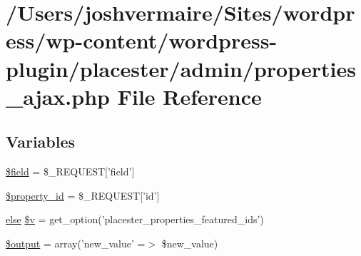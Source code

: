 \hypertarget{properties__ajax_8php}{
\section{/Users/joshvermaire/Sites/wordpress/wp-\/content/wordpress-\/plugin/placester/admin/properties\_\-ajax.php File Reference}
\label{dd/d22/properties__ajax_8php}
}
\subsection*{Variables}
\begin{DoxyCompactItemize}
\item 
\hyperlink{properties__ajax_8php_a83e4d6721f3491a4fd780dbd3ce1a3c0}{\$field} = \$\_\-REQUEST\mbox{[}'field'\mbox{]}
\item 
\hyperlink{properties__ajax_8php_a88c3dc31d5eb48b33b9ed5cfe1ffd62f}{\$property\_\-id} = \$\_\-REQUEST\mbox{[}'id'\mbox{]}
\item 
\hyperlink{listings__list__of__map_8php_a0544c3fe466e421738dae463968b70ba}{else} \hyperlink{properties__ajax_8php_ad1c227dc9d92d82b36539080e8c6dff9}{\$v} = get\_\-option('placester\_\-properties\_\-featured\_\-ids')
\item 
\hyperlink{properties__ajax_8php_a73004ce9cd673c1bfafd1dc351134797}{\$output} = array('new\_\-value' =$>$ \$new\_\-value)
\end{DoxyCompactItemize}


